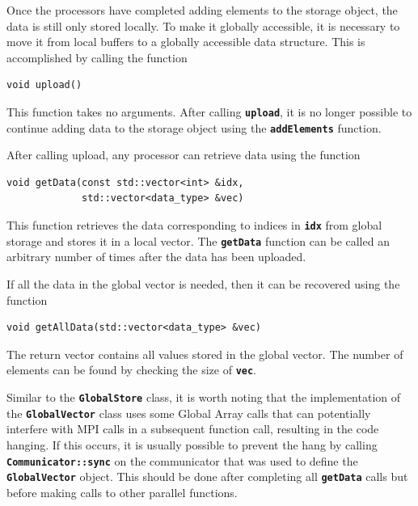 Once the processors have completed adding elements to the storage object, the data is still only stored locally. To make it globally accessible, it is necessary to move it from local buffers to a globally accessible data structure. This is accomplished by calling the function

{
\color{red}
\begin{Verbatim}[fontseries=b]
void upload()
\end{Verbatim}
}

This function takes no arguments. After calling \texttt{\textbf{upload}}, it is
no longer possible to continue adding data to the storage object using the
\texttt{\textbf{addElements}} function.

After calling upload, any processor can retrieve data using the function

{
\color{red}
\begin{Verbatim}[fontseries=b]
void getData(const std::vector<int> &idx,
             std::vector<data_type> &vec)
\end{Verbatim}
}

This function retrieves the data corresponding to indices in
\texttt{\textbf{idx}} from global storage and stores it in a local vector. The
\texttt{\textbf{getData}} function can be called an arbitrary number of times after the data has been uploaded.

If all the data in the global vector is needed, then it can be recovered using
the function

{
\color{red}
\begin{Verbatim}[fontseries=b]
void getAllData(std::vector<data_type> &vec)
\end{Verbatim}
}

The return vector contains all values stored in the global vector. The number of
elements can be found by checking the size of \texttt{\textbf{vec}}.

Similar to the \texttt{\textbf{GlobalStore}} class, it is worth noting that
the implementation of the \texttt{\textbf{GlobalVector}} class uses some Global
Array calls that can potentially interfere with MPI calls in a subsequent
function call, resulting in the code hanging. If this occurs, it is usually
possible to prevent the hang by calling \texttt{\textbf{Communicator::sync}} on
the communicator that was used to define the \texttt{\textbf{GlobalVector}}
object. This should be done after completing all \texttt{\textbf{getData}} calls
but before making calls to other parallel functions.
\newline
\hyperlink{topDoc}{\color{blue}{Top}}
